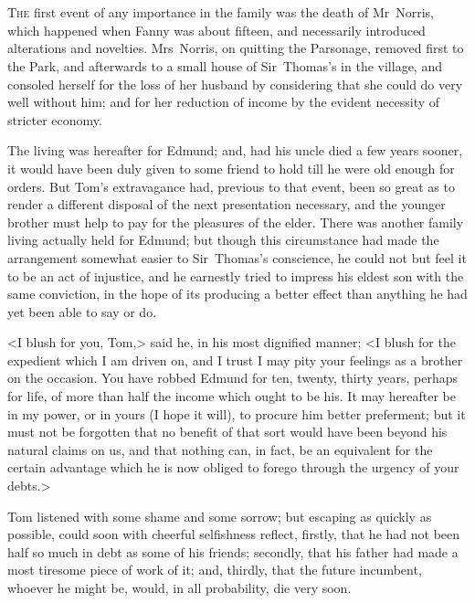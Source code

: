 \chapter[Chapter \thechapter]{} 

 \lettrine[lraise=0.3]{T}{he} first event of any importance in the family was the death of Mr~Norris, which happened when Fanny was about fifteen, and necessarily introduced alterations and novelties. Mrs~Norris, on quitting the Parsonage, removed first to the Park, and afterwards to a small house of Sir~Thomas's in the village, and consoled herself for the loss of her husband by considering that she could do very well without him; and for her reduction of income by the evident necessity of stricter economy.

The living was hereafter for Edmund; and, had his uncle died a few years sooner, it would have been duly given to some friend to hold till he were old enough for orders. But Tom's extravagance had, previous to that event, been so great as to render a different disposal of the next presentation necessary, and the younger brother must help to pay for the pleasures of the elder. There was another family living actually held for Edmund; but though this circumstance had made the arrangement somewhat easier to Sir~Thomas's conscience, he could not but feel it to be an act of injustice, and he earnestly tried to impress his eldest son with the same conviction, in the hope of its producing a better effect than anything he had yet been able to say or do.

<I blush for you, Tom,> said he, in his most dignified manner; <I blush for the expedient which I am driven on, and I trust I may pity your feelings as a brother on the occasion. You have robbed Edmund for ten, twenty, thirty years, perhaps for life, of more than half the income which ought to be his. It may hereafter be in my power, or in yours (I hope it will), to procure him better preferment; but it must not be forgotten that no benefit of that sort would have been beyond his natural claims on us, and that nothing can, in fact, be an equivalent for the certain advantage which he is now obliged to forego through the urgency of your debts.>

Tom listened with some shame and some sorrow; but escaping as quickly as possible, could soon with cheerful selfishness reflect, firstly, that he had not been half so much in debt as some of his friends; secondly, that his father had made a most tiresome piece of work of it; and, thirdly, that the future incumbent, whoever he might be, would, in all probability, die very soon.

